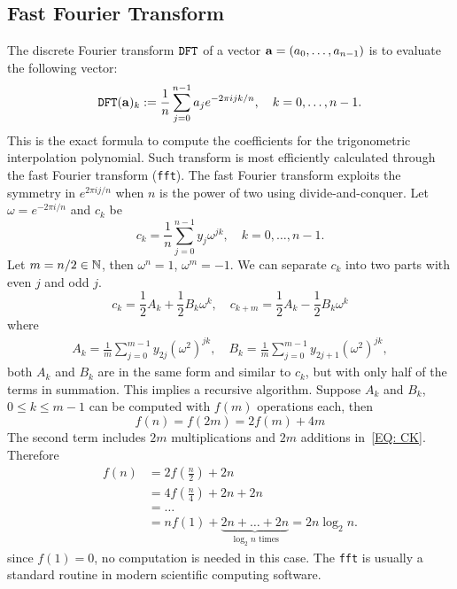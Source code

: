 \subsection{Fast Fourier Transform}
The discrete Fourier transform $\textup{\texttt{DFT}}$ of a vector $\mathbf a = (a_0, \dots, a_{n-1})$ is to evaluate the following vector:
$$\textup{\texttt{DFT}}(\mathbf a)_{k} := \frac{1}{n}\sum_{j=0}^{n-1} a_je^{-2\pi i jk/n},\quad k = 0,\dots, n-1.$$
This is the exact formula to compute the coefficients for the trigonometric interpolation polynomial. Such transform is most efficiently calculated through the fast Fourier transform (\texttt{fft}).
The fast Fourier transform exploits the symmetry in $e^{2\pi i j/n}$ when $n$ is the power of two using divide-and-conquer. Let $\omega = e^{-2\pi i/n}$ and $c_k$ be 
\begin{equation}
    c_k = \frac{1}{n}\sum_{j=0}^{n-1} y_j\omega^{jk},\quad k = 0,\dots, n-1.
\end{equation}
Let $m = n/2\in \mathbb N$, then $\omega^n = 1$, $\omega^m = -1$. We can separate $c_k$ into two parts with even $j$ and odd $j$.
\begin{equation}\label{EQ: C_K}
    c_k = \frac{1}{2} A_k + \frac{1}{2} B_k \omega^k,\quad c_{k+m} = \frac{1}{2} A_k - \frac{1}{2} B_k \omega^k 
\end{equation}
where 
\begin{equation}\label{EQ: AK BK}
    \begin{aligned}
        A_k = \frac{1}{m} \sum_{j=0}^{m-1} y_{2j} (\omega^2)^{jk},\quad B_k = \frac{1}{m} \sum_{j=0}^{m-1} y_{2j+1} (\omega^2)^{jk},
    \end{aligned}
\end{equation}
both $A_k$ and $B_k$ are in the same form and similar to $c_k$, but with only half of the terms in summation. This implies a recursive algorithm. Suppose $A_k$ and $B_k$, $0\le k\le m-1$ can be computed with $f(m)$ operations each, then 
\begin{equation}
   f(n) =  f(2m) = 2 f(m) + 4m
\end{equation}
The second term includes $2m$ multiplications and $2m$ additions in~\eqref{EQ: CK}. Therefore
\begin{equation}
    \begin{aligned}
        f(n)& = 2f(\frac{n}{2}) + 2n \\
&= 4f(\frac{n}{4}) + 2 n + 2n \\ 
&=\dots \\
&= n f(1) + \underbrace{2n + \dots + 2n}_{\log_2 n \text{ times}} = 2n \log_2 n.
    \end{aligned}
\end{equation}
since $f(1) = 0$, no computation is needed in this case.  The \texttt{fft} is usually a standard routine in modern scientific computing software. 


